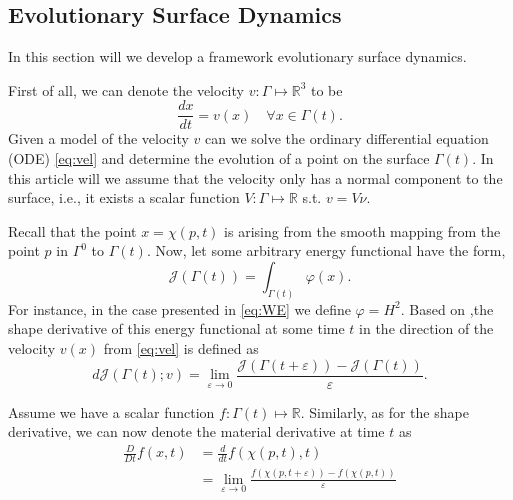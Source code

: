 \subsection{Evolutionary Surface Dynamics}%
\label{sub:evolutionary_equations}

In this section will we develop a framework evolutionary surface dynamics.

First of all, we can denote the velocity $v: \Gamma \mapsto \mathbb{R} ^3$ to be
\begin{equation}
    \label{eq:vel}
\frac{dx }{ d t}  = v\left( x \right) \quad \forall x \in \Gamma \left( t \right) .
\end{equation}
Given a model of the velocity $v$ can we solve the ordinary differential equation (ODE) \eqref{eq:vel} and determine the evolution of a point on the surface $\Gamma\left( t \right)  $. In this article will we assume that the velocity only has a
normal component to the surface, i.e., it exists a scalar function $V: \Gamma \mapsto \mathbb{R} $ s.t. $v = V \nu  $.

Recall that the point $x = \chi \left( p,t \right)  $ is arising from the smooth mapping from the point $p $ in  $\Gamma ^{0} $ to $\Gamma \left( t \right) $. Now, let some arbitrary energy functional have the form,
\[
\mathcal{J}\left( \Gamma\left( t \right)   \right)  = \int_{\Gamma\left( t \right)  }^{} \varphi \left( x  \right) .
\]
For instance, in the case presented in \eqref{eq:WE} we define $\varphi = H ^2$. Based on \cite{dougan2012first},the shape derivative of this energy functional at some time $t$ in the direction of the velocity $v\left( x \right) $ from \eqref{eq:vel} is defined as \[
d \mathcal{J} \left( \Gamma \left( t \right) ; v  \right) = \lim_{\varepsilon  \to 0} \frac{\mathcal{J}  \left( \Gamma \left( t + \varepsilon  \right) \right)  - \mathcal{J}\left( \Gamma \left( t  \right) \right)      }{\varepsilon }.
\]

Assume we have a scalar function $f: \Gamma\left( t \right)  \mapsto \mathbb{R}  $. Similarly, as for the shape derivative, we can now denote the material derivative at time $t$ as
\[
    \begin{split}
\frac{D}{Dt}  f\left( x,t \right)  & = \frac{d}{dt} f \left( \chi \left( p,t \right) , t \right) \\
&= \lim_{\varepsilon \to 0}  \frac{f \left( \chi \left( p, t + \varepsilon  \right)  \right) - f \left( \chi \left( p, t  \right)  \right) }{ \varepsilon }
    \end{split}
\]

